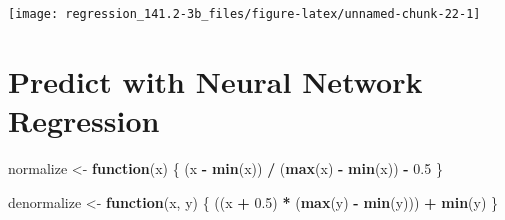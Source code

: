 \documentclass[]{book}
\newenvironment{Shaded}{\begin{snugshade}}{\end{snugshade}}
\newcommand{\CommentTok}[1]{\textcolor[rgb]{0.56,0.35,0.01}{\textit{#1}}}
\newcommand{\ControlFlowTok}[1]{\textcolor[rgb]{0.13,0.29,0.53}{\textbf{#1}}}
\newcommand{\DataTypeTok}[1]{\textcolor[rgb]{0.13,0.29,0.53}{#1}}
\newcommand{\DecValTok}[1]{\textcolor[rgb]{0.00,0.00,0.81}{#1}}
\newcommand{\FloatTok}[1]{\textcolor[rgb]{0.00,0.00,0.81}{#1}}
\newcommand{\KeywordTok}[1]{\textcolor[rgb]{0.13,0.29,0.53}{\textbf{#1}}}
\newcommand{\NormalTok}[1]{#1}
\newcommand{\OperatorTok}[1]{\textcolor[rgb]{0.81,0.36,0.00}{\textbf{#1}}}
\newcommand{\StringTok}[1]{\textcolor[rgb]{0.31,0.60,0.02}{#1}}
\begin{document}
\begin{center}\texttt{[image: regression\_141.2-3b\_files/figure-latex/unnamed-chunk-22-1]} \end{center}

\begin{Shaded}
\end{Shaded}

\hypertarget{predict-with-neural-network-regression}{%
\section{Predict with Neural Network Regression}\label{predict-with-neural-network-regression}}

\begin{Shaded}
\begin{Highlighting}[]
\NormalTok{normalize <-}\StringTok{ }\ControlFlowTok{function}\NormalTok{(x) \{}
\NormalTok{  (x }\OperatorTok{-}\StringTok{ }\KeywordTok{min}\NormalTok{(x)) }\OperatorTok{/}\StringTok{ }\NormalTok{(}\KeywordTok{max}\NormalTok{(x) }\OperatorTok{-}\StringTok{ }\KeywordTok{min}\NormalTok{(x)) }\OperatorTok{-}\StringTok{ }\FloatTok{0.5}
\NormalTok{\}}
\end{Highlighting}
\end{Shaded}

\begin{Shaded}
\begin{Highlighting}[]
\NormalTok{denormalize <-}\StringTok{ }\ControlFlowTok{function}\NormalTok{(x, y) \{}
\NormalTok{  ((x }\OperatorTok{+}\StringTok{ }\FloatTok{0.5}\NormalTok{) }\OperatorTok{*}\StringTok{ }\NormalTok{(}\KeywordTok{max}\NormalTok{(y) }\OperatorTok{-}\StringTok{ }\KeywordTok{min}\NormalTok{(y))) }\OperatorTok{+}\StringTok{ }\KeywordTok{min}\NormalTok{(y)}
\NormalTok{\}}
\end{Highlighting}
\end{Shaded}

\begin{Shaded}
\end{Shaded}
\end{document}
